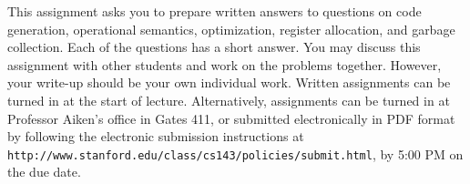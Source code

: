 \documentclass[11pt]{article}
\begin{document}


This assignment asks you to prepare written answers to questions on
code generation, operational semantics, optimization, register
allocation, and garbage collection.  Each of the questions has a short
answer.  You may discuss this assignment with other students and work
on the problems together.  However, your write-up should be your own
individual work.  Written assignments can be turned in at the start of
lecture.  Alternatively, assignments can be turned in at Professor
Aiken's office in Gates 411, or submitted electronically in PDF format
by following the electronic submission instructions at
\texttt{http://www.stanford.edu/class/cs143/policies/submit.html}, by
5:00 PM on the due date.

\end{document}
